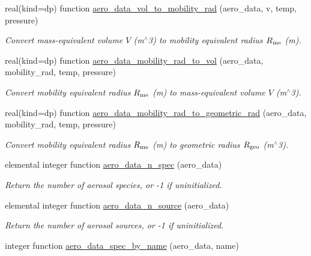 \begin{DoxyCompactItemize}
real(kind=dp) function \mbox{\hyperlink{namespacepmc__aero__data_a11af7aca91af3bd2781a2f42ff6cadb0}{aero\+\_\+data\+\_\+vol\+\_\+to\+\_\+mobility\+\_\+rad}} (aero\+\_\+data, v, temp, pressure)
\begin{DoxyCompactList}\small\item\em Convert mass-\/equivalent volume $V$ (m$^\wedge$3) to mobility equivalent radius $R_{\rm me}$ (m). \end{DoxyCompactList}\item 
real(kind=dp) function \mbox{\hyperlink{namespacepmc__aero__data_a46521ba9e8600f7319bb8387fb39266d}{aero\+\_\+data\+\_\+mobility\+\_\+rad\+\_\+to\+\_\+vol}} (aero\+\_\+data, mobility\+\_\+rad, temp, pressure)
\begin{DoxyCompactList}\small\item\em Convert mobility equivalent radius $R_{\rm me}$ (m) to mass-\/equivalent volume $V$ (m$^\wedge$3). \end{DoxyCompactList}\item 
real(kind=dp) function \mbox{\hyperlink{namespacepmc__aero__data_a423e7cd833b5e231a2b932953cc06d5e}{aero\+\_\+data\+\_\+mobility\+\_\+rad\+\_\+to\+\_\+geometric\+\_\+rad}} (aero\+\_\+data, mobility\+\_\+rad, temp, pressure)
\begin{DoxyCompactList}\small\item\em Convert mobility equivalent radius $R_{\rm me}$ (m) to geometric radius $R_{\rm geo}$ (m$^\wedge$3). \end{DoxyCompactList}\item 
elemental integer function \mbox{\hyperlink{namespacepmc__aero__data_a0ad6e20bd94def8cbbcac7dda7ec3089}{aero\+\_\+data\+\_\+n\+\_\+spec}} (aero\+\_\+data)
\begin{DoxyCompactList}\small\item\em Return the number of aerosol species, or -\/1 if uninitialized. \end{DoxyCompactList}\item 
elemental integer function \mbox{\hyperlink{namespacepmc__aero__data_a270b6c2baba361257005658bc293ecde}{aero\+\_\+data\+\_\+n\+\_\+source}} (aero\+\_\+data)
\begin{DoxyCompactList}\small\item\em Return the number of aerosol sources, or -\/1 if uninitialized. \end{DoxyCompactList}\item 
integer function \mbox{\hyperlink{namespacepmc__aero__data_a80791fa1af8de683ac3d724d0b9291d1}{aero\+\_\+data\+\_\+spec\+\_\+by\+\_\+name}} (aero\+\_\+data, name)

\end{DoxyCompactItemize}
